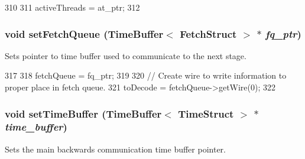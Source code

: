 \begin{DoxyCode}
310 {
311     activeThreads = at_ptr;
312 }
\end{DoxyCode}
\hypertarget{classDefaultFetch_ad1be90519aa7737ddf8e41de079a5ea9}{
\subsubsection[{setFetchQueue}]{\setlength{\rightskip}{0pt plus 5cm}void setFetchQueue ({\bf TimeBuffer}$<$ {\bf FetchStruct} $>$ $\ast$ {\em fq\_\-ptr})}}
\label{classDefaultFetch_ad1be90519aa7737ddf8e41de079a5ea9}
Sets pointer to time buffer used to communicate to the next stage. 


\begin{DoxyCode}
317 {
318     fetchQueue = fq_ptr;
319 
320     // Create wire to write information to proper place in fetch queue.
321     toDecode = fetchQueue->getWire(0);
322 }
\end{DoxyCode}
\hypertarget{classDefaultFetch_aa9fe72c29dff746fa7023a15c1134ada}{
\subsubsection[{setTimeBuffer}]{\setlength{\rightskip}{0pt plus 5cm}void setTimeBuffer ({\bf TimeBuffer}$<$ {\bf TimeStruct} $>$ $\ast$ {\em time\_\-buffer})}}
\label{classDefaultFetch_aa9fe72c29dff746fa7023a15c1134ada}
Sets the main backwards communication time buffer pointer. 



